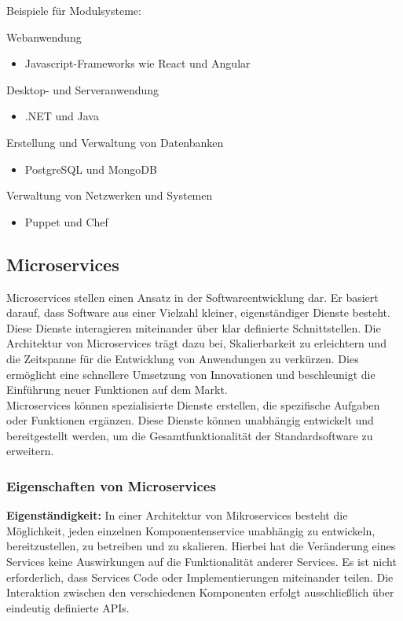 Beispiele für Modulsysteme:

Webanwendung
\begin{itemize}
    \item Javascript-Frameworks wie React und Angular
\end{itemize}

Desktop- und Serveranwendung
\begin{itemize}
    \item .NET und Java
\end{itemize}

Erstellung und Verwaltung von Datenbanken
\begin{itemize}
    \item PostgreSQL und MongoDB
\end{itemize}

Verwaltung von Netzwerken und Systemen
\begin{itemize}
    \item Puppet und Chef
\end{itemize}
\cite{modulsystem}

\newpage
\subsection*{Microservices}

Microservices stellen einen Ansatz in der Softwareentwicklung dar. Er basiert darauf, 
dass Software aus einer Vielzahl kleiner, eigenständiger Dienste besteht. 
Diese Dienste interagieren miteinander über klar definierte Schnittstellen.
Die Architektur von Microservices trägt dazu bei, Skalierbarkeit zu erleichtern und die 
Zeitspanne für die Entwicklung von Anwendungen zu verkürzen. 
Dies ermöglicht eine schnellere Umsetzung von Innovationen und beschleunigt die Einführung 
neuer Funktionen auf dem Markt.
\\
Microservices können spezialisierte Dienste erstellen, die spezifische Aufgaben oder 
Funktionen ergänzen. Diese Dienste können unabhängig entwickelt und bereitgestellt werden, 
um die Gesamtfunktionalität der Standardsoftware zu erweitern. 
\cite{microservices}

\subsubsection*{Eigenschaften von Microservices}

\textbf{Eigenständigkeit:}
In einer Architektur von Mikroservices besteht die Möglichkeit, jeden einzelnen Komponentenservice 
unabhängig zu entwickeln, bereitzustellen, zu betreiben und zu skalieren. 
Hierbei hat die Veränderung eines Services keine Auswirkungen auf die Funktionalität anderer Services. 
Es ist nicht erforderlich, dass Services Code oder Implementierungen miteinander teilen. 
Die Interaktion zwischen den verschiedenen Komponenten erfolgt ausschließlich 
über eindeutig definierte APIs.
\cite{microservices}

